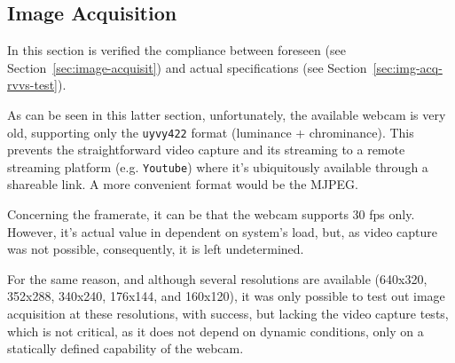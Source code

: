 \subsection{Image Acquisition}%
\label{sec:img-acq-verif}
In this section is verified the compliance between foreseen (see
Section~\ref{sec:image-acquisit}) and actual specifications (see
Section~\ref{sec:img-acq-rvvs-test}).

As can be seen in this latter section, unfortunately, the available webcam is
very old, supporting only the \texttt{uyvy422} format (luminance +
chrominance). This prevents the straightforward video capture and its streaming
to a remote streaming platform (e.g. \texttt{Youtube}) where it's ubiquitously
available through a shareable link. A more convenient format would be the
MJPEG.

Concerning the framerate, it can be that the webcam supports 30 fps
only. However, it's actual value in dependent on system's load, but, as video
capture was not possible, consequently, it is left undetermined.

For the same reason, and although several resolutions are available (640x320,
352x288, 340x240, 176x144, and 160x120), it was only possible to test out image
acquisition at these resolutions, with success, but lacking the video capture
tests, which is not critical, as it does not depend on dynamic conditions, only
on a statically defined capability of the webcam.
